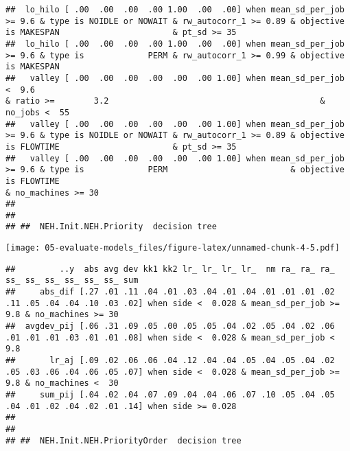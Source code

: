 \documentclass[
]{article}
\begin{document}
\begin{verbatim}
##  lo_hilo [ .00  .00  .00  .00 1.00  .00  .00] when mean_sd_per_job >= 9.6 & type is NOIDLE or NOWAIT & rw_autocorr_1 >= 0.89 & objective is MAKESPAN                       & pt_sd >= 35                                                                                  
##  lo_hilo [ .00  .00  .00  .00 1.00  .00  .00] when mean_sd_per_job >= 9.6 & type is             PERM & rw_autocorr_1 >= 0.99 & objective is MAKESPAN                                                                                                                      
##   valley [ .00  .00  .00  .00  .00  .00 1.00] when mean_sd_per_job <  9.6                                                                            & ratio >=        3.2                                           & no_jobs <  55                                      
##   valley [ .00  .00  .00  .00  .00  .00 1.00] when mean_sd_per_job >= 9.6 & type is NOIDLE or NOWAIT & rw_autocorr_1 >= 0.89 & objective is FLOWTIME                       & pt_sd >= 35                                                                                  
##   valley [ .00  .00  .00  .00  .00  .00 1.00] when mean_sd_per_job >= 9.6 & type is             PERM                         & objective is FLOWTIME                                                                                                   & no_machines >= 30
## 
## 
## ##  NEH.Init.NEH.Priority  decision tree
\end{verbatim}

\texttt{[image: 05-evaluate-models\_files/figure-latex/unnamed-chunk-4-5.pdf]}

\begin{verbatim}
##         ..y  abs avg dev kk1 kk2 lr_ lr_ lr_ lr_  nm ra_ ra_ ra_ ss_ ss_ ss_ ss_ ss_ ss_ sum                                                                 
##     abs_dif [.27 .01 .11 .04 .01 .03 .04 .01 .04 .01 .01 .01 .02 .11 .05 .04 .04 .10 .03 .02] when side <  0.028 & mean_sd_per_job >= 9.8 & no_machines >= 30
##  avgdev_pij [.06 .31 .09 .05 .00 .05 .05 .04 .02 .05 .04 .02 .06 .01 .01 .01 .03 .01 .01 .08] when side <  0.028 & mean_sd_per_job <  9.8                    
##       lr_aj [.09 .02 .06 .06 .04 .12 .04 .04 .05 .04 .05 .04 .02 .05 .03 .06 .04 .06 .05 .07] when side <  0.028 & mean_sd_per_job >= 9.8 & no_machines <  30
##     sum_pij [.04 .02 .04 .07 .09 .04 .04 .06 .07 .10 .05 .04 .05 .04 .01 .02 .04 .02 .01 .14] when side >= 0.028                                             
## 
## 
## ##  NEH.Init.NEH.PriorityOrder  decision tree
\end{verbatim}
\end{document}
